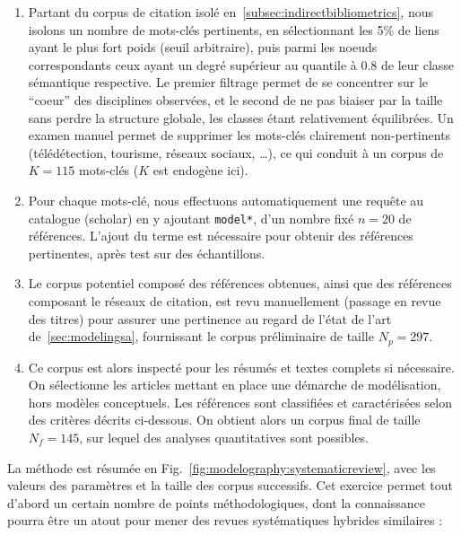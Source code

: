 \begin{enumerate}
\item Partant du corpus de citation isolé en~\ref{subsec:indirectbibliometrics}, nous isolons un nombre de mots-clés pertinents, en sélectionnant les 5\% de liens ayant le plus fort poids (seuil arbitraire), puis parmi les noeuds correspondants ceux ayant un degré supérieur au quantile à 0.8 de leur classe sémantique respective. Le premier filtrage permet de se concentrer sur le ``coeur'' des disciplines observées, et le second de ne pas biaiser par la taille sans perdre la structure globale, les classes étant relativement équilibrées. Un examen manuel permet de supprimer les mots-clés clairement non-pertinents (télédétection, tourisme, réseaux sociaux, \ldots), ce qui conduit à un corpus de $K=115$ mots-clés ($K$ est endogène ici).
\item Pour chaque mots-clé, nous effectuons automatiquement une requête au catalogue (scholar) en y ajoutant \texttt{model*}, d'un nombre fixé $n=20$ de références. L'ajout du terme est nécessaire pour obtenir des références pertinentes, après test sur des échantillons.
\item Le corpus potentiel composé des références obtenues, ainsi que des références composant le réseaux de citation, est revu manuellement (passage en revue des titres) pour assurer une pertinence au regard de l'état de l'art de~\ref{sec:modelingsa}, fournissant le corpus préliminaire de taille $N_p = 297$.
\item Ce corpus est alors inspecté pour les résumés et textes complets si nécessaire. On sélectionne les articles mettant en place une démarche de modélisation, hors modèles conceptuels. Les références sont classifiées et caractérisées selon des critères décrits ci-dessous. On obtient alors un corpus final de taille $N_f = 145$, sur lequel des analyses quantitatives sont possibles.
\end{enumerate}

La méthode est résumée en Fig.~\ref{fig:modelography:systematicreview}, avec les valeurs des paramètres et la taille des corpus successifs. Cet exercice permet tout d'abord un certain nombre de points méthodologiques, dont la connaissance pourra être un atout pour mener des revues systématiques hybrides similaires :

